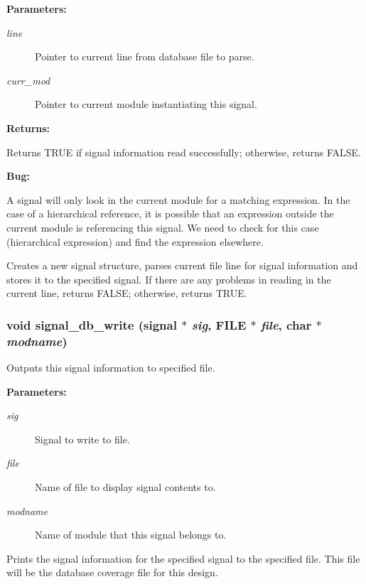 \begin{Desc}
\item[{\bf Parameters: }]\par
\begin{description}
\item[
{\em line}]Pointer to current line from database file to parse. \item[
{\em curr\_\-mod}]Pointer to current module instantiating this signal.

\end{description}
\end{Desc}
\begin{Desc}
\item[{\bf Returns: }]\par
Returns TRUE if signal information read successfully; otherwise, returns FALSE.

\end{Desc}


\begin{Desc}
\item[{\bf {\bf Bug: }}]\par
A signal will only look in the current module for a matching expression. In the case of a hierarchical reference, it is possible that an expression outside the current module is referencing this signal. We need to check for this case (hierarchical expression) and find the expression elsewhere.\end{Desc}


Creates a new signal structure, parses current file line for signal information and stores it to the specified signal. If there are any problems in reading in the current line, returns FALSE; otherwise, returns TRUE. 
\subsubsection{\setlength{\rightskip}{0pt plus 5cm}void signal\_\-db\_\-write ({\bf signal} $\ast$ {\em sig}, FILE $\ast$ {\em file}, char $\ast$ {\em modname})}\label{signal_8h_a2}


Outputs this signal information to specified file.

\begin{Desc}
\item[{\bf Parameters: }]\par
\begin{description}
\item[
{\em sig}]Signal to write to file. \item[
{\em file}]Name of file to display signal contents to. \item[
{\em modname}]Name of module that this signal belongs to.

\end{description}
\end{Desc}
Prints the signal information for the specified signal to the specified file. This file will be the database coverage file for this design. 

